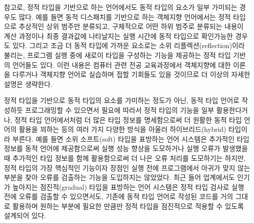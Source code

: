 참고로, 정적 타입을 기반으로 하는 언어에서도 동적 타입의 요소가 일부
가미되는 경우도 많다. 예를 들면 동적 디스패치를 기반으로 하는
객체지향 언어에서는 정적 타입으로 추상적인 상위 범주만 분류되고,
구체적으로 어떤 하위 범주로 분류되는 내용이 계산 과정이나 최종 결과값에
나타날지는 실행 시간에 동적 타입으로 확인가능한 경우도 있다. 그리고
조금 더 동적 타입에 가까운 요소로는 소위 리플렉션(reflection)이라 불리는,
프로그램 실행 중에 새로이 타입을 구성하는 기능을 제공하는 정적 타입 기반의
언어들도 있다. 이런 내용은 컴퓨터 관련 전공 교육과정에서 객체지향에
대한 이론을 다루거나 객체지향 언어로 실습하며 접할 기회들도 있을 것이므로
더 이상의 자세한 설명은 생략한다.

정적 타입을 기반으로 동적 타입의 요소를 가미하는 정도가 아닌,
동적 타입 언어로 작성하듯 프로그래밍할 수 있으면서 필요에 따라서
정적 타입의 기능을 일부 활용한다거나, 정적 타입 언어에서처럼
더 많은 타입 정보를 명세함으로써 더 원활한 동적 타입 언어의 활용을
꾀하는 등의 여러 가지 다양한 방식을 아울러
%
%
하이브리드(hybrid) 타입이라
부른다. 예를 들면 소위
%
%
%
%
소프트(soft) 타입\cite{Cartwright2004soft}을
표방하는 언어 시스템은 추가적인 타입 정보를 동적 언어에 제공함으로써
실행 성능 향상을 도모하거나 실행 오류가 발생했을 때 추가적인 타입 정보를
함께 활용함으로써 더 나은 오류 처리를 도모하기는 하지만, 정적 타입의
가장 핵심적인 기능이자 장점인 실행 전에 프로그램에서 아귀가 맞지 않는
부분을 찾아 오류를 검출하는 기능을 도입하지는 않았었다. 최근 들어
업계에서도 인기가 높아지는 
%
%
%
%
점진적(gradual) 타입\cite{Jeremy2006gradual}을
표방하는 언어 시스템은 정적 타입 검사로 실행 전에 오류를 검출할 수
있으면서도, 기존에 동적 타입 언어로 작성된 코드를 거의 그대로 활용하며
원하는 부분에 필요한 만큼만 정적 타입을 점진적으로 적용할 수 있도록
설계되어 있다.

